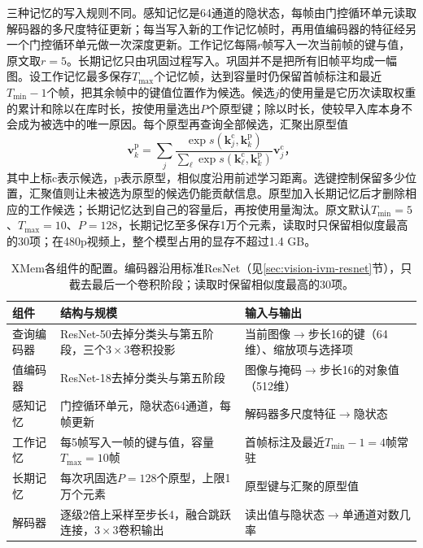三种记忆的写入规则不同。感知记忆是64通道的隐状态，每帧由门控循环单元读取解码器的多尺度特征更新；每当写入新的工作记忆帧时，再用值编码器的特征经另一个门控循环单元做一次深度更新。工作记忆每隔$r$帧写入一次当前帧的键与值，原文取$r=5$。长期记忆只由巩固过程写入。巩固并不是把所有旧帧平均成一幅图。设工作记忆最多保存$T_{\max}$个记忆帧，达到容量时仍保留首帧标注和最近$T_{\min}-1$个帧，把其余帧中的键值位置作为候选。候选$j$的使用量是它历次读取权重的累计和除以在库时长，按使用量选出$P$个原型键；除以时长，使较早入库本身不会成为被选中的唯一原因。每个原型再查询全部候选，汇聚出原型值
\begin{equation}
  \bm{v}^{\mathrm{p}}_k
  =\sum_j
   \frac{\exp s(\bm{k}^{\mathrm{c}}_j,\bm{k}^{\mathrm{p}}_k)}
        {\sum_\ell\exp s(\bm{k}^{\mathrm{c}}_\ell,\bm{k}^{\mathrm{p}}_k)}
   \bm{v}^{\mathrm{c}}_j\text{，}
  \label{eq:vision-video-xmem-consolidation}
\end{equation}
其中上标$\mathrm{c}$表示候选，$\mathrm{p}$表示原型，相似度沿用前述学习距离。选键控制保留多少位置，汇聚值则让未被选为原型的候选仍能贡献信息。原型加入长期记忆后才删除相应的工作候选；长期记忆达到自己的容量后，再按使用量淘汰。原文默认$T_{\min}=5$、$T_{\max}=10$、$P=128$，长期记忆至多保存1万个元素，读取时只保留相似度最高的30项；在480p视频上，整个模型占用的显存不超过1.4 GB。

\begin{table}[htbp]
  \centering
  \small
  \begin{tabularx}{\linewidth}{@{}lXX@{}}
    \toprule
    组件 & 结构与规模 & 输入与输出\\
    \midrule
    查询编码器 & ResNet-50去掉分类头与第五阶段，三个$3\times3$卷积投影 & 当前图像$\to$步长16的键（64维）、缩放项与选择项\\
    值编码器 & ResNet-18去掉分类头与第五阶段 & 图像与掩码$\to$步长16的对象值（512维）\\
    感知记忆 & 门控循环单元，隐状态64通道，每帧更新 & 解码器多尺度特征$\to$隐状态\\
    工作记忆 & 每5帧写入一帧的键与值，容量$T_{\max}=10$帧 & 首帧标注及最近$T_{\min}-1=4$帧常驻\\
    长期记忆 & 每次巩固选$P=128$个原型，上限1万个元素 & 原型键与汇聚的原型值\\
    解码器 & 逐级2倍上采样至步长4，融合跳跃连接，$3\times3$卷积输出 & 读出值与隐状态$\to$单通道对数几率\\
    \bottomrule
  \end{tabularx}
  \caption{XMem各组件的配置。编码器沿用标准ResNet（见\ref{sec:vision-ivm-resnet}节），只截去最后一个卷积阶段；读取时保留相似度最高的30项。}
  \label{tab:vision-video-xmem-config}
\end{table}

